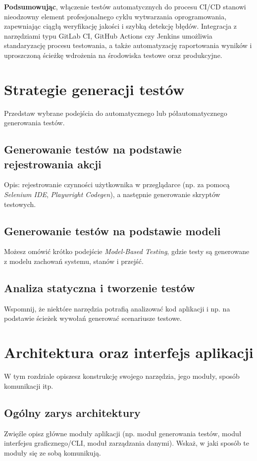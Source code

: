 \documentclass[12pt]{report}
\begin{document}
\bigskip
\noindent
\textbf{Podsumowując}, włączenie testów automatycznych do procesu CI/CD stanowi nieodzowny element profesjonalnego cyklu wytwarzania oprogramowania, zapewniając ciągłą weryfikację jakości i szybką detekcję błędów. Integracja z narzędziami typu GitLab CI, GitHub Actions czy Jenkins umożliwia standaryzację procesu testowania, a także automatyzację raportowania wyników i uproszczoną ścieżkę wdrożenia na środowiska testowe oraz produkcyjne.

\chapter{Strategie generacji testów}
{Przedstaw wybrane podejścia do automatycznego lub półautomatycznego generowania testów.}

\section{Generowanie testów na podstawie rejestrowania akcji}
{Opis: rejestrowanie czynności użytkownika w przeglądarce (np. za pomocą \emph{Selenium IDE}, \emph{Playwright Codegen}), a następnie generowanie skryptów testowych.}

\section{Generowanie testów na podstawie modeli}
{Możesz omówić krótko podejście \emph{Model-Based Testing}, gdzie testy są generowane z modelu zachowań systemu, stanów i przejść.}

\section{Analiza statyczna i tworzenie testów}
{Wspomnij, że niektóre narzędzia potrafią analizować kod aplikacji i np. na podstawie ścieżek wywołań generować scenariusze testowe.}

\chapter{Architektura oraz interfejs aplikacji}
{W tym rozdziale opiszesz konstrukcję swojego narzędzia, jego moduły, sposób komunikacji itp.}

\section{Ogólny zarys architektury}
{Zwięźle opisz główne moduły aplikacji (np. moduł generowania testów, moduł interfejsu graficznego/CLI, moduł zarządzania danymi). Wskaż, w jaki sposób te moduły się ze sobą komunikują.}
\end{document}
